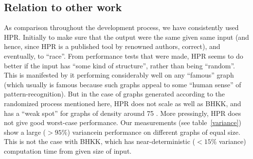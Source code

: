 \documentclass[a4paper]{article}
\begin{document}
\subsection{Relation to other work}
As comparison throughout the development process, we have consistently used HPR. Initially to make sure that the output were the same given same input (and hence, since HPR is a published tool by renowned authors, correct), and eventually, to ``race''. From performance tests that were made, HPR seems to do better if the input has ``some kind of structure'', rather than being ``random''. This is manifested by it performing considerably well on any ``famous'' graph (which usually is famous because such graphs appeal to some ``human sense'' of pattern-recognition). But in the case of graphs generated according to the randomized process mentioned here, HPR does not scale as well as BHKK, and has a ``weak spot'' for graphs of density around 75 \cite{haggard}. More pressingly, HPR does not give good worst-case performance. Our measurements (see table~\ref{variance}) show a large ($> 95\%$) variance\footnotemark in performance on different graphs of equal size. This is not the case with BHKK, which has near-deterministic ($< 15\%$ variance) computation time from given size of input.

\end{document}
